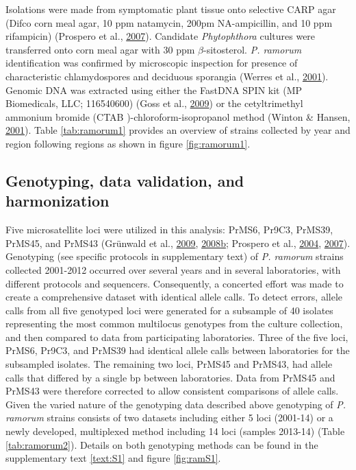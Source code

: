 \documentclass[double,11pt]{beavtex}
\begin{document}
  Isolations were made from symptomatic plant tissue onto selective CARP
  agar (Difco corn meal agar, 10 ppm natamycin, 200pm NA-ampicillin, and
  10 ppm rifampicin) (Prospero et al.,
  \protect\hyperlink{ref-prospero2007population}{2007}). Candidate
  \emph{Phytophthora} cultures were transferred onto corn meal agar with
  30 ppm \(\beta\)-sitosterol. \emph{P. ramorum} identification was
  confirmed by microscopic inspection for presence of characteristic
  chlamydospores and deciduous sporangia (Werres et al.,
  \protect\hyperlink{ref-werres2001phytophthora}{2001}). Genomic DNA was
  extracted using either the FastDNA SPIN kit (MP Biomedicals, LLC;
  116540600) (Goss et al.,
  \protect\hyperlink{ref-goss2009population}{2009}) or the cetyltrimethyl
  ammonium bromide (CTAB )-chloroform-isopropanol method (Winton \&
  Hansen, \protect\hyperlink{ref-winton2001molecular}{2001}). Table
  \ref{tab:ramorum1} provides an overview of strains collected by year and
  region following regions as shown in figure \ref{fig:ramorum1}.
  
  \subsection{Genotyping, data validation, and
  harmonization}\label{genotyping-data-validation-and-harmonization}
  
  Five microsatellite loci were utilized in this analysis: PrMS6, Pr9C3,
  PrMS39, PrMS45, and PrMS43 (Grünwald et al.,
  \protect\hyperlink{ref-grunwald2009standardizing}{2009},
  \protect\hyperlink{ref-grunwald2008susceptibility}{2008}\protect\hyperlink{ref-grunwald2008susceptibility}{b};
  Prospero et al., \protect\hyperlink{ref-prospero2004isolation}{2004},
  \protect\hyperlink{ref-prospero2007population}{2007}). Genotyping (see
  specific protocols in supplementary text) of \emph{P. ramorum} strains
  collected 2001-2012 occurred over several years and in several
  laboratories, with different protocols and sequencers. Consequently, a
  concerted effort was made to create a comprehensive dataset with
  identical allele calls. To detect errors, allele calls from all five
  genotyped loci were generated for a subsample of 40 isolates
  representing the most common multilocus genotypes from the culture
  collection, and then compared to data from participating laboratories.
  Three of the five loci, PrMS6, Pr9C3, and PrMS39 had identical allele
  calls between laboratories for the subsampled isolates. The remaining
  two loci, PrMS45 and PrMS43, had allele calls that differed by a single
  bp between laboratories. Data from PrMS45 and PrMS43 were therefore
  corrected to allow consistent comparisons of allele calls. Given the
  varied nature of the genotyping data described above genotyping of
  \emph{P. ramorum} strains consists of two datasets including either 5
  loci (2001-14) or a newly developed, multiplexed method including 14
  loci (samples 2013-14) (Table \ref{tab:ramorum2}). Details on both
  genotyping methods can be found in the supplementary text \ref{text:S1}
  and figure \ref{fig:ramS1}.
  
\end{document}
